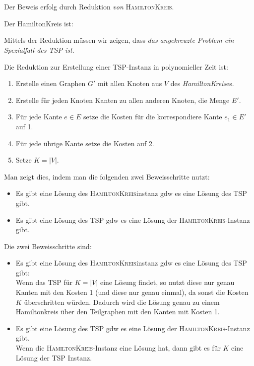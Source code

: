 \documentclass{article}
\begin{document}
\section{}
Der Beweis erfolg durch Reduktion \emph{von} \textsc{HamiltonKreis}.

Der HamiltonKreis ist:

Mittels der Reduktion müssen wir zeigen, dass \emph{das angekreuzte Problem ein Spezialfall des TSP ist.}

Die Reduktion zur Erstellung einer TSP-Instanz in polynomieller Zeit ist:
\begin{enumerate}
	\item Erstelle einen Graphen $G'$ mit allen Knoten aus $V$ des \emph{HamiltonKreis}es. 
  \item Erstelle für jeden Knoten Kanten zu allen anderen Knoten, die Menge $E'$.
  \item Für jede Kante $e\in E$ setze die Kosten für die korrespondiere Kante $e_1\in E'$ auf 1.
  \item Für jede übrige Kante setze die Kosten auf 2.
  \item Setze $K = |V|$.
\end{enumerate}

Man zeigt dies, indem man die folgenden zwei Beweisschritte nutzt:
\begin{itemize}
	\item Es gibt eine Lösung des \textsc{HamiltonKreis}instanz gdw es eine Lösung des \textsc{TSP} gibt.
  \item Es gibt eine Lösung des \textsc{TSP} gdw es eine Lösung der \textsc{HamiltonKreis}-Instanz gibt.
\end{itemize}

Die zwei Beweisschritte sind:
\begin{itemize}
	\item Es gibt eine Lösung des \textsc{HamiltonKreis}instanz gdw es eine Lösung des \textsc{TSP} gibt: \\
        Wenn das TSP für $K = |V|$ eine Lösung findet, so nutzt diese nur genau Kanten mit den Kosten 1 (und diese nur genau einmal), da sonst die Kosten $K$ überschritten würden. Dadurch wird die Lösung genau zu einem Hamiltonkreis über den Teilgraphen mit den Kanten mit Kosten 1.
  \item Es gibt eine Lösung des \textsc{TSP} gdw es eine Lösung der \textsc{HamiltonKreis}-Instanz gibt. \\
        Wenn die \textsc{HamiltonKreis}-Instanz eine Lösung hat, dann gibt es für $K$ eine Lösung der TSP Instanz.
\end{itemize}
\end{document}
